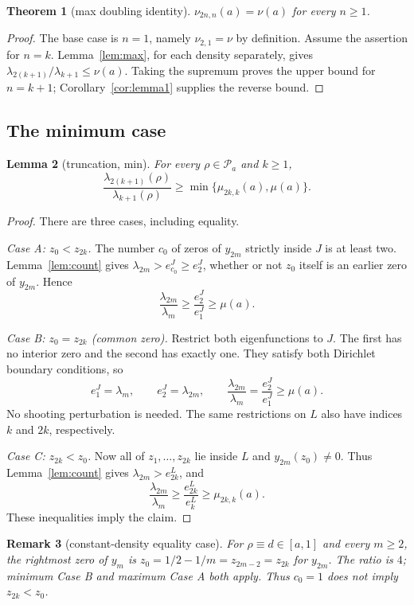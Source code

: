 ﻿\documentclass[11pt]{article}
\newtheorem{theorem}{Theorem}[section]
\newtheorem{lemma}[theorem]{Lemma}
\newtheorem{remark}[theorem]{Remark}
\begin{document}
\begin{theorem}[max doubling identity]\label{thm:max}
 $\nu_{2n,n}(a)=\nu(a)$ for every $n\ge1$.
\end{theorem}

\begin{proof}
 The base case is $n=1$, namely $\nu_{2,1}=\nu$ by definition.
 Assume the assertion for $n=k$. Lemma~\ref{lem:max}, for each
 density separately, gives $\lambda_{2(k+1)}/\lambda_{k+1}\le\nu(a)$.
 Taking the supremum proves the upper bound for $n=k+1$;
 Corollary~\ref{cor:lemma1} supplies the reverse bound.
\end{proof}

\subsection{The minimum case}

\begin{lemma}[truncation, min]\label{lem:min}
 For every $\rho\in\mathcal P_a$ and $k\ge1$,
 \[
 \frac{\lambda_{2(k+1)}(\rho)}{\lambda_{k+1}(\rho)}
 \ge\min\{\mu_{2k,k}(a),\mu(a)\}.
 \]
\end{lemma}

\begin{proof}
 There are three cases, including equality.

 \emph{Case A: $z_0<z_{2k}$.}
 The number $c_0$ of zeros of $y_{2m}$ strictly inside $J$ is at least
 two. Lemma~\ref{lem:count} gives
 $\lambda_{2m}>e_{c_0}^J\ge e_2^J$, whether or not $z_0$ itself is an
 earlier zero of $y_{2m}$. Hence
 \[
 \frac{\lambda_{2m}}{\lambda_m}
 \ge\frac{e_2^J}{e_1^J}\ge\mu(a).
 \]

 \emph{Case B: $z_0=z_{2k}$ (common zero).}
 Restrict both eigenfunctions to $J$. The first has no interior zero
 and the second has exactly one. They satisfy both Dirichlet boundary
 conditions, so
 \[
 e_1^J=\lambda_m,\qquad e_2^J=\lambda_{2m},\qquad
 \frac{\lambda_{2m}}{\lambda_m}=\frac{e_2^J}{e_1^J}\ge\mu(a).
 \]
 No shooting perturbation is needed. The same restrictions on $L$
 also have indices $k$ and $2k$, respectively.

 \emph{Case C: $z_{2k}<z_0$.}
 Now all of $z_1,\ldots,z_{2k}$ lie inside $L$ and
 $y_{2m}(z_0)\ne0$. Thus Lemma~\ref{lem:count} gives
 $\lambda_{2m}>e_{2k}^L$, and
 \[
 \frac{\lambda_{2m}}{\lambda_m}
 \ge\frac{e_{2k}^L}{e_k^L}\ge\mu_{2k,k}(a).
 \]
 These inequalities imply the claim.
\end{proof}

\begin{remark}[constant-density equality case]
 For $\rho\equiv d\in[a,1]$ and every $m\ge2$, the rightmost zero of
 $y_m$ is $z_0=1/2-1/m=z_{2m-2}=z_{2k}$ for $y_{2m}$.
 The ratio is $4$; minimum Case B and maximum Case A both apply.
 Thus $c_0=1$ does not imply $z_{2k}<z_0$.
\end{remark}
\end{document}
